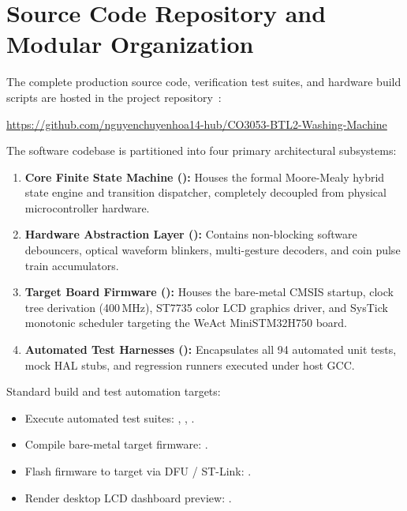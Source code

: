 \section{Source Code Repository and Modular Organization}
\label{app:source}

The complete production source code, verification test suites, and hardware build scripts are hosted in the project repository~\cite{projectrepo}:
\begin{center}
  \url{https://github.com/nguyenchuyenhoa14-hub/CO3053-BTL2-Washing-Machine}
\end{center}

\noindent The software codebase is partitioned into four primary architectural subsystems:
\begin{enumerate}
  \item \textbf{Core Finite State Machine ():} Houses the formal Moore-Mealy hybrid state engine and transition dispatcher, completely decoupled from physical microcontroller hardware.
  \item \textbf{Hardware Abstraction Layer ():} Contains non-blocking software debouncers, optical waveform blinkers, multi-gesture decoders, and coin pulse train accumulators.
  \item \textbf{Target Board Firmware ():} Houses the bare-metal CMSIS startup, clock tree derivation (400\,MHz), ST7735 color LCD graphics driver, and SysTick monotonic scheduler targeting the WeAct MiniSTM32H750 board.
  \item \textbf{Automated Test Harnesses ():} Encapsulates all 94 automated unit tests, mock HAL stubs, and regression runners executed under host GCC.
\end{enumerate}

\noindent Standard build and test automation targets:
\begin{itemize}
  \item Execute automated test suites: , , .
  \item Compile bare-metal target firmware: .
  \item Flash firmware to target via DFU / ST-Link: .
  \item Render desktop LCD dashboard preview: .
\end{itemize}

